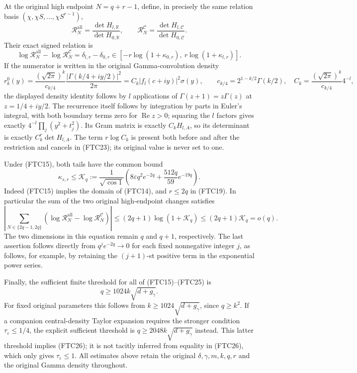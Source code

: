 At the original high endpoint $N=q+r-1$, define, in precisely the same
relation basis $(\chi,\chi S,\ldots,\chi S^{r-1})$,
\[
 \mathcal R_{N}^{\mathrm{all}}=
 \frac{\det H_{l,\mathbb R}}{\det H_{0,\mathbb R}},\qquad
 \mathcal R_N^{\mathcal C}=
 \frac{\det H_{l,\mathcal C}}{\det H_{0,\mathcal C}}.
\]
Their exact signed relation is
\begin{equation}
 \log\mathcal R_N^{\mathrm{all}}-\log\mathcal R_N^{\mathcal C}
 =\delta_{l,r}-\delta_{0,r}
 \in[-r\log(1+\kappa_{0,r}),\ r\log(1+\kappa_{l,r})].
 \tag{FTC23}
\end{equation}
If the numerator is written in the original Gamma-convolution density
\[
 r_k^0(y)=\frac{(\sqrt{2\pi})^k}{c_{k/4}}
 \frac{|\Gamma(k/4+iy/2)|^2}{2\pi}
 =C_k|f_l(c+iy)|^2\sigma(y),\qquad
 c_{k/4}=2^{1-k/2}\Gamma(k/2),\quad
 C_k=\frac{(\sqrt{2\pi})^k}{c_{k/4}}4^{-l},
\]
the displayed density identity follows by $l$ applications of
$\Gamma(z+1)=z\Gamma(z)$ at $z=1/4+iy/2$.
The recurrence itself follows by integration by parts in Euler's integral,
with both boundary terms zero for $\operatorname{Re}z>0$; squaring the
$l$ factors gives exactly $4^{-l}\prod_j(y^2+t_j^2)$.
Its Gram matrix is exactly $C_kH_{l,A}$,
so its determinant is exactly $C_k^r\det H_{l,A}$.  The term
$r\log C_k$ is present both before and after the restriction and cancels
in (FTC23); its original value is never set to one.

Under (FTC15), both tails have the common bound
\begin{equation}
 \kappa_{s,r}\le\mathcal K_q:=
 \frac1{\sqrt{\cos1}}
 \left(8\varepsilon q^2e^{-2q}+\frac{512q}{59}e^{-19q}\right).
 \tag{FTC24}
\end{equation}
Indeed (FTC15) implies the domain of (FTC14), and $r\le2q$ in (FTC19).
In particular the sum of the two original high-endpoint changes satisfies
\begin{equation}
 \left|\sum_{N\in\{2q-1,2q\}}
 \left(\log\mathcal R_N^{\mathrm{all}}-
 \log\mathcal R_N^{\mathcal C}\right)\right|
 \le(2q+1)\log(1+\mathcal K_q)
 \le(2q+1)\mathcal K_q=o(q).
 \tag{FTC25}
\end{equation}
The two dimensions in this equation remain $q$ and $q+1$, respectively.
The last assertion follows directly from $q^j e^{-2q}\to0$ for each
fixed nonnegative integer $j$, as follows, for example, by retaining
the $(j+1)$-st positive term in the exponential power series.

Finally, the sufficient finite threshold for all of (FTC15)--(FTC25) is
\begin{equation}
 q\ge1024k\sqrt{d+g_\gamma}.
 \tag{FTC26}
\end{equation}
For fixed original parameters this follows from
$k\ge1024\sqrt{d+g_\gamma}$, since $q\ge k^2$.
If a companion central-density Taylor expansion requires the stronger
condition $\tau_\varepsilon\le1/4$, the explicit sufficient threshold is
$q\ge2048k\sqrt{d+g_\gamma}$ instead.  This latter threshold implies
(FTC26); it is not tacitly inferred from equality in (FTC26), which only
gives $\tau_\varepsilon\le1$.  All estimates above retain the original
$\delta,\gamma,m,k,q,r$ and the original Gamma density throughout.
